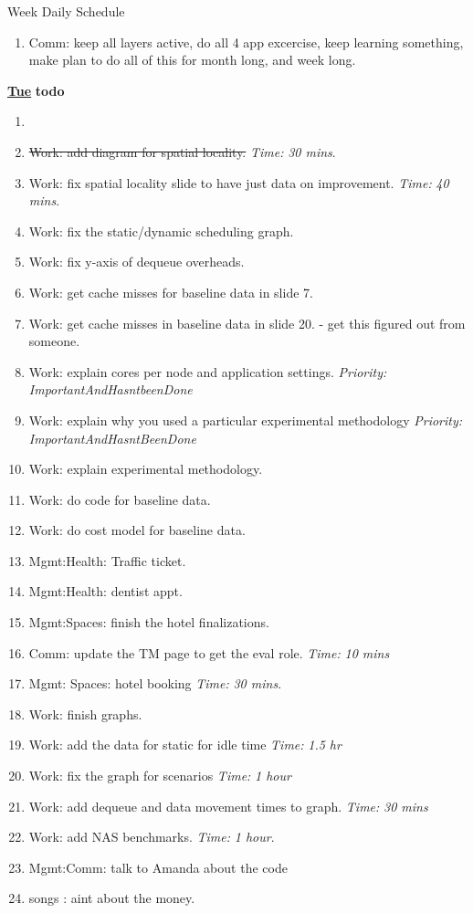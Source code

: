 \documentclass[serif, mathserif, final]{beamer}
\newcommand{\doneTask}[1]{\item \sout{#1}}
\newcommand{\timeEst}[1]{\textit{Time:} \textit{#1}}
\newcommand{\priority}[1]{\textit{Priority:} \textit{#1}}
\begin{document}
\begin{frame}{}
\begin{columns}
\begin{column}{0.50\linewidth}
\begin{block}{Week Daily Schedule}
\begin{enumerate}
    \item \tiny Comm: keep all layers active, do all 4 app excercise, keep learning something, make plan to do all of this for month long, and week long. 
  \end{enumerate} 
  \textbf{\small \underline{Tue}} 
  \textbf{todo} 
  \begin{enumerate} 
  \item \tiny \doneTask{Work: add diagram for spatial locality.} \timeEst{30 mins}. 
  \item \tiny Work: fix spatial locality slide to have just data on improvement. \timeEst{40 mins}. 
  \item \tiny Work: fix the static/dynamic scheduling graph. 
  \item \tiny Work: fix y-axis of dequeue overheads. 
  \item \tiny Work: get cache misses for baseline data in slide 7. 
  \item \tiny Work: get cache misses in baseline data in slide 20.  - get this figured out from someone. 

  \item \tiny Work: explain cores per node and application settings. \priority{ImportantAndHasntbeenDone} 
  \item \tiny Work: explain why you used a particular experimental methodology \priority{ImportantAndHasntBeenDone}
  \item \tiny Work: explain experimental methodology. 
  \item \tiny Work: do code for baseline data. 
  \item \tiny Work: do cost model for baseline data.
  \item \tiny Mgmt:Health: Traffic ticket.  
  \item \tiny Mgmt:Health: dentist appt.
  \item \tiny Mgmt:Spaces: finish the hotel finalizations. 
  \item \tiny Comm: update the TM page to get the eval role. \timeEst{10 mins} 
  
  \item \tiny Mgmt: Spaces: hotel booking \timeEst{30 mins}. 
  \item \tiny Work: finish graphs.  
  \item \tiny Work: add the data for static for idle time \timeEst{1.5 hr} 
  \item \tiny Work: fix the graph for scenarios \timeEst{1 hour} 
  \item \tiny Work: add dequeue and data movement times to graph.  \timeEst{30 mins} 
  \item \tiny Work: add NAS benchmarks. \timeEst{1 hour}.  
  \item \tiny Mgmt:Comm: talk to Amanda about the code 
  \item \tiny songs : aint about the money.     
  \end{enumerate}  


\end{block}
\end{column}
\end{columns}
\end{frame}
\end{document}
